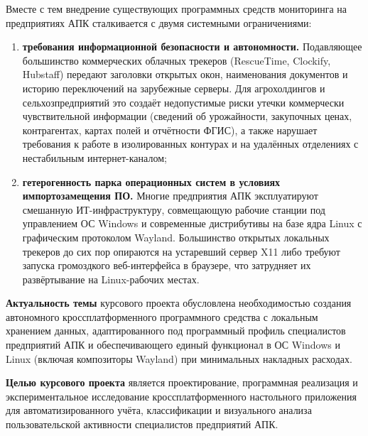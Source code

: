 \documentclass{timcw}
\begin{document}
Вместе с тем внедрение существующих программных средств мониторинга на предприятиях АПК сталкивается с двумя системными ограничениями:
\begin{enumerate}
  \item \textbf{требования информационной безопасности и автономности.} Подавляющее большинство коммерческих облачных трекеров (RescueTime, Clockify, Hubstaff) передают заголовки открытых окон, наименования документов и историю переключений на зарубежные серверы. Для агрохолдингов и сельхозпредприятий это создаёт недопустимые риски утечки коммерчески чувствительной информации (сведений об урожайности, закупочных ценах, контрагентах, картах полей и отчётности ФГИС), а также нарушает требования к работе в изолированных контурах и на удалённых отделениях с нестабильным интернет-каналом;
  \item \textbf{гетерогенность парка операционных систем в условиях импортозамещения ПО.} Многие предприятия АПК эксплуатируют смешанную ИТ-инфраструктуру, совмещающую рабочие станции под управлением ОС Windows и современные дистрибутивы на базе ядра Linux с графическим протоколом Wayland. Большинство открытых локальных трекеров до сих пор опираются на устаревший сервер X11 либо требуют запуска громоздкого веб-интерфейса в браузере, что затрудняет их развёртывание на Linux-рабочих местах.
\end{enumerate}

\textbf{Актуальность темы} курсового проекта обусловлена необходимостью создания автономного кроссплатформенного программного средства с локальным хранением данных, адаптированного под программный профиль специалистов предприятий АПК и обеспечивающего единый функционал в ОС Windows и Linux (включая композиторы Wayland) при минимальных накладных расходах.

\textbf{Целью курсового проекта} является проектирование, программная реализация и экспериментальное исследование кроссплатформенного настольного приложения для автоматизированного учёта, классификации и визуального анализа пользовательской активности специалистов предприятий АПК.
\end{document}
